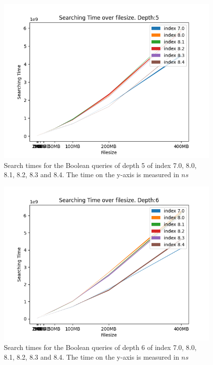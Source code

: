 \begin{figure}[H]
    \centering
    \includegraphics[width=.8\textwidth]{LaTeX/Pictures/Results/BooleanSearchDepth4.png}
    \caption{Search times for the Boolean queries of depth 5 of index 7.0, 8.0, 8.1, 8.2, 8.3 and 8.4. The time on the y-axis is measured in $ns$}
    \label{fig:BPindextime23454}
\end{figure}

\begin{figure}[H]
    \centering
    \includegraphics[width=.8\textwidth]{LaTeX/Pictures/Results/BooleanSearchDepth5.png}
    \caption{Search times for the Boolean queries of depth 6 of index 7.0, 8.0, 8.1, 8.2, 8.3 and 8.4. The time on the y-axis is measured in $ns$}
    \label{fig:BPindextime23455}
\end{figure}

